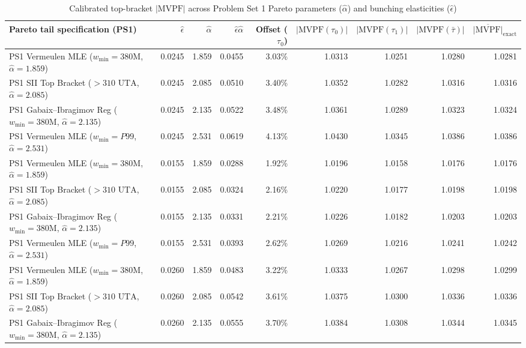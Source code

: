 \begin{table}[htbp]
\centering
\caption{Calibrated top-bracket $|\mathrm{MVPF}|$ across Problem Set 1 Pareto parameters ($\hat{\alpha}$) and bunching elasticities ($\hat{\epsilon}$)}
\label{tab:p3_mvpf}
\small
\begin{adjustbox}{max width=\textwidth}
\begin{tabular}{lrrrrrrrr}
\toprule
Pareto tail specification (PS1) & $\hat{\epsilon}$ & $\hat{\alpha}$ & $\hat{\epsilon}\hat{\alpha}$ & Offset ($\tau_0$) & $|\mathrm{MVPF}(\tau_0)|$ & $|\mathrm{MVPF}(\tau_1)|$ & $|\mathrm{MVPF}(\bar{\tau})|$ & $\overline{|\mathrm{MVPF}|}_{\mathrm{exact}}$ \\
\midrule
PS1 Vermeulen MLE ($w_{\min}=380\text{M}$, $\hat{\alpha}=1.859$) & 0.0245 & 1.859 & 0.0455 & 3.03\% & 1.0313 & 1.0251 & 1.0280 & 1.0281 \\
PS1 SII Top Bracket ($>310\text{ UTA}$, $\hat{\alpha}=2.085$) & 0.0245 & 2.085 & 0.0510 & 3.40\% & 1.0352 & 1.0282 & 1.0316 & 1.0316 \\
PS1 Gabaix--Ibragimov Reg ($w_{\min}=380\text{M}$, $\hat{\alpha}=2.135$) & 0.0245 & 2.135 & 0.0522 & 3.48\% & 1.0361 & 1.0289 & 1.0323 & 1.0324 \\
PS1 Vermeulen MLE ($w_{\min}=P99$, $\hat{\alpha}=2.531$) & 0.0245 & 2.531 & 0.0619 & 4.13\% & 1.0430 & 1.0345 & 1.0386 & 1.0386 \\
\midrule
PS1 Vermeulen MLE ($w_{\min}=380\text{M}$, $\hat{\alpha}=1.859$) & 0.0155 & 1.859 & 0.0288 & 1.92\% & 1.0196 & 1.0158 & 1.0176 & 1.0176 \\
PS1 SII Top Bracket ($>310\text{ UTA}$, $\hat{\alpha}=2.085$) & 0.0155 & 2.085 & 0.0324 & 2.16\% & 1.0220 & 1.0177 & 1.0198 & 1.0198 \\
PS1 Gabaix--Ibragimov Reg ($w_{\min}=380\text{M}$, $\hat{\alpha}=2.135$) & 0.0155 & 2.135 & 0.0331 & 2.21\% & 1.0226 & 1.0182 & 1.0203 & 1.0203 \\
PS1 Vermeulen MLE ($w_{\min}=P99$, $\hat{\alpha}=2.531$) & 0.0155 & 2.531 & 0.0393 & 2.62\% & 1.0269 & 1.0216 & 1.0241 & 1.0242 \\
\midrule
PS1 Vermeulen MLE ($w_{\min}=380\text{M}$, $\hat{\alpha}=1.859$) & 0.0260 & 1.859 & 0.0483 & 3.22\% & 1.0333 & 1.0267 & 1.0298 & 1.0299 \\
PS1 SII Top Bracket ($>310\text{ UTA}$, $\hat{\alpha}=2.085$) & 0.0260 & 2.085 & 0.0542 & 3.61\% & 1.0375 & 1.0300 & 1.0336 & 1.0336 \\
PS1 Gabaix--Ibragimov Reg ($w_{\min}=380\text{M}$, $\hat{\alpha}=2.135$) & 0.0260 & 2.135 & 0.0555 & 3.70\% & 1.0384 & 1.0308 & 1.0344 & 1.0345 \\

\end{tabular}
\end{adjustbox}
\end{table}
